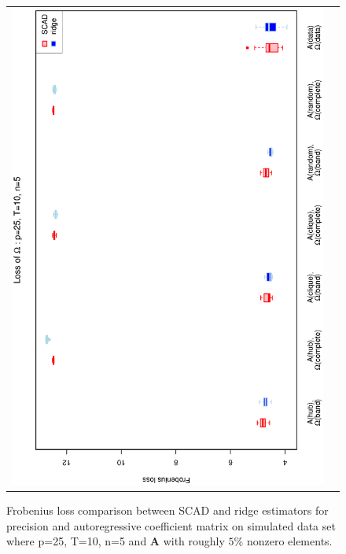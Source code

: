 \begin{figure}[h!]
\begin{tabular}{cc}
\includegraphics[scale=0.45,angle=270]{LossOmega25T10N5_5.eps}
\end{tabular}
\caption{Frobenius loss comparison between SCAD and ridge estimators for precision and autoregressive coefficient matrix on simulated data set where p=25, T=10, n=5 and $\mathbf{A}$ with roughly $5\%$ nonzero elements.}
\label{figSM:Loss25T10N5_5}
\end{figure}


